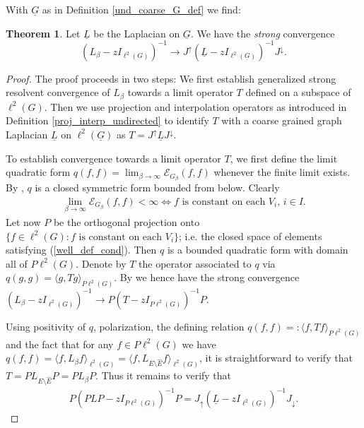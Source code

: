 \documentclass[reqno,12pt,letterpaper]{amsart}
\numberwithin{equation}{section}
\newcommand{\IG}{I_{\ell^2(G)}}
\newcommand{\1}{\mathds{1}}
\theoremstyle{definition}
\newtheorem{Thm}[Th]{Theorem}
\begin{document}
\medskip
With $\underline{G}$ as in Definition \ref{und_coarse_G_def} we find:
\begin{Thm}\label{undir_appr_thm_strongly}
	Let $\underline{L}$ be the Laplacian on $\underline{G}$. We have the \emph{strong} convergence
	\begin{equation}\label{strong_undirected_resolvent_closeness}
		(L_\beta - z I_{\ell^2(G)})^{-1} \rightarrow  J^\uparrow  (\underline{L} - z I_{\ell^2(\underline{G})})^{-1} J^\downarrow.
	\end{equation}
\end{Thm}





\begin{proof}
	The proof proceeds in two steps: We first establish generalized strong resolvent convergence of $L_\beta$ towards a limit operator $T$ defined on a subspace of $\ell^2(G)$. Then we use projection and interpolation operators as introduced in Definition \ref{proj_interp_undirected} to identify $T$ with a coarse grained graph Laplacian $\underline{L}$ on $\ell^2(\underline{G})$ as $T = J^\uparrow \underline{L} J^\downarrow$.
	
	\medskip
	
	
	To establish convergence towards a limit operator $T$, we first define the limit quadratic form 
		$
		q(f,f) = \lim_{\beta \rightarrow \infty} \mathcal{E}_{G_\beta}(f,f)
		$
whenever the finite limit exists. By \cite[VIII Theorem 3.13a]{kato1995perturbation}, $q$ is a closed symmetric form bounded from below. 
Clearly
\begin{align}\label{well_def_cond}
	 \lim\limits_{\beta \rightarrow \infty} \mathcal{E}_{G_\beta}(f,f) < \infty \Leftrightarrow \text{$f$ is constant on each $V_i$, $i \in I$}.
\end{align}
Let  now $P$ be the orthogonal projection onto $\{f \in \ell^2(G): \text{$f$ is constant on each $V_i$}\}$; i.e. the closed space of elements satisfying (\ref{well_def_cond}).
Then $q$ is a bounded quadratic form with domain all of $P\ell^2(G)$. Denote by $T$ the operator associated to $q$ via $q(g,g) = \langle g,Tg\rangle_{P\ell^2(G)}$. By \cite[Theorem 4.1]{simon1978canonical} we hence have the strong convergence $(L_\beta - z \IG)^{-1} \rightarrow P(T - z I_{P \ell^2(G)})^{-1}P$.

\medskip
Using positivity of $q$, polarization, the defining relation $
	q(f,f) =: \langle f, T f\rangle_{P \ell^2(G)}$
and the fact that for any $f \in P \ell^2(G)$ we have $q(f,f) = \langle f, L_\beta f\rangle_{\ell^2(G)} = \langle f, L_{E \setminus \hat{E}} f\rangle_{\ell^2(G)}$, it is straightforward to verify that $T = PL_{E \setminus \hat{E}}P =  PL_{\beta}P. $
\medskip Thus it remains to verify that
\begin{align}\label{intermediate_objective}
P(PLP - z I_{P \ell^2(G)})^{-1}P =  J_\uparrow  (\underline{L} - z I_{\ell^2(\underline{G})})^{-1} J_\downarrow.
\end{align}



\end{proof}
\end{document}
